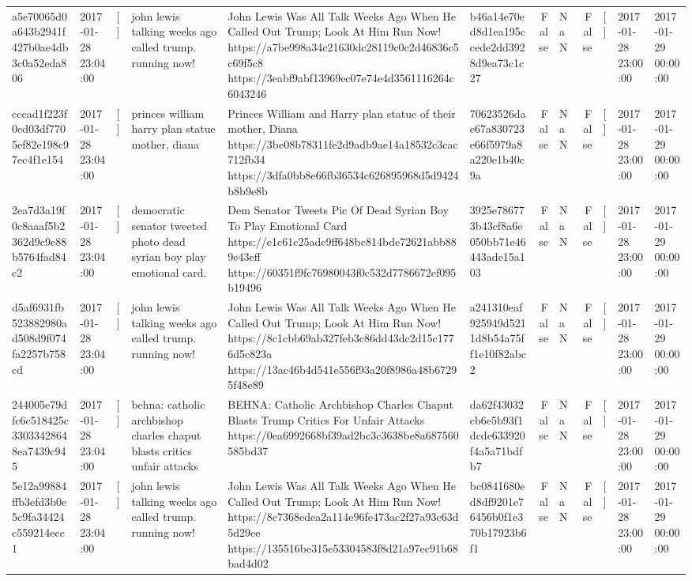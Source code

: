 \begin{tabular}{llllllrlrlll}
a5e70065d0a643b2941f427b0ae4db3c0a52eda806 & 2017-01-28 23:04:00 & [] & john lewis talking weeks ago called trump. running now! & John Lewis Was All Talk Weeks Ago When He Called Out Trump; Look At Him Run Now! https://a7be998a34c21630dc28119c0c2d46836c5c69f5c8 https://3eabf9abf13969ec07e74e4d3561116264c6043246 & b46a14e70ed8d1ea195ccede2dd3928d9ea73c1c27 & False & NaN & False & [] & 2017-01-28 23:00:00 & 2017-01-29 00:00:00 \\
cccad1f223f0ed03df7705ef82e198c97ec4f1e154 & 2017-01-28 23:04:00 & [] & princes william harry plan statue mother, diana & Princes William and Harry plan statue of their mother, Diana https://3be08b78311fe2d9adb9ae14a18532c3cac712fb34 https://3dfa0bb8e66fb36534c626895968d5d9424b8b9e8b & 70623526dae67a830723e66f5979a8a220e1b40c9a & False & NaN & False & [] & 2017-01-28 23:00:00 & 2017-01-29 00:00:00 \\
2ea7d3a19f0c8aaaf5b2362d9c9e88b5764fad84c2 & 2017-01-28 23:04:00 & [] & democratic senator tweeted photo dead syrian boy play emotional card. & Dem Senator Tweets Pic Of Dead Syrian Boy To Play Emotional Card https://e1c61c25adc9ff648bc814bde72621abb889e43eff https://60351f9fc76980043f0c532d7786672ef095b19496 & 3925e786773b43cf8a6e050bb71e46443ade15a103 & False & NaN & False & [] & 2017-01-28 23:00:00 & 2017-01-29 00:00:00 \\
d5af6931fb523882980ad508d9f074fa2257b758cd & 2017-01-28 23:04:00 & [] & john lewis talking weeks ago called trump. running now! & John Lewis Was All Talk Weeks Ago When He Called Out Trump; Look At Him Run Now! https://8c1cbb69ab327feb3c86dd43dc2d15c1776d5c823a https://13ac46b4d541e556f93a20f8986a48b67295f48e89 & a241310eaf925949d5211d8b54a75ff1e10f82abc2 & False & NaN & False & [] & 2017-01-28 23:00:00 & 2017-01-29 00:00:00 \\
244005e79dfc6c518425c33033428648ea7439c945 & 2017-01-28 23:04:00 & [] & behna: catholic archbishop charles chaput blasts critics unfair attacks & BEHNA: Catholic Archbishop Charles Chaput Blasts Trump Critics For Unfair Attacks https://0ea6992668bf39ad2bc3c3638be8a687560585bd37 & da62f43032cb6e5b93f1dcde633920f4a5a71bdfb7 & False & NaN & False & [] & 2017-01-28 23:00:00 & 2017-01-29 00:00:00 \\
5e12a99884ffb3efd3b0e5c9fa34424c559214ecc1 & 2017-01-28 23:04:00 & [] & john lewis talking weeks ago called trump. running now! & John Lewis Was All Talk Weeks Ago When He Called Out Trump; Look At Him Run Now! https://8c7368edea2a114e96fe473ac2f27a93c63d5d29ee https://135516be315e53304583f8d21a97ec91b68bad4d02 & bc0841680ed8df9201e76456b0f1e370b17923b6f1 & False & NaN & False & [] & 2017-01-28 23:00:00 & 2017-01-29 00:00:00 \\

\end{tabular}
